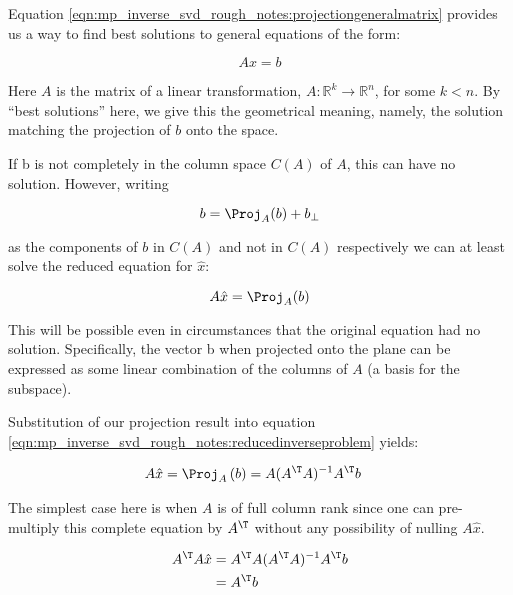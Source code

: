 


Equation \ref{eqn:mp_inverse_svd_rough_notes:projectiongeneralmatrix} provides us a way to find best solutions to general equations of the form:


\[
A x = b
\]

Here $A$ is the matrix of a linear transformation, $A : \mathbb{R}^k \rightarrow \mathbb{R}^n$, for some $k<n$.
By ``best solutions'' here, we give this the geometrical meaning, namely, the solution matching the projection of $b$ onto the space.

If b is not completely in the column space $C(A)$ of $A$, this can have no solution.  However, writing

\[
b = \Proj_A(b) + b_\perp
\]

as the components of $b$ in $C(A)$ and not in $C(A)$ respectively we can at least solve the reduced equation for $\hat{x}$:


\begin{equation}\label{eqn:mp_inverse_svd_rough_notes:reducedinverseproblem}
A \hat{x} = \Proj_A(b)
\end{equation}


This will be possible even in circumstances that the original equation had no solution.  Specifically, the vector b when projected onto the plane can be expressed as some
linear combination of the columns of $A$ (a basis for the subspace).

Substitution of our projection result into equation \ref{eqn:mp_inverse_svd_rough_notes:reducedinverseproblem} yields:

\begin{align*}
A \hat{x} 
&= \Proj_{A}\left(b\right) = A (A^\T A)^{-1} A^\T b
\end{align*}

The simplest case here is when $A$ is of full column rank since one can pre-multiply this complete equation by $A^\T$ without any possibility of nulling
$A \hat{x}$.

\begin{align*}
A^\T A \hat{x} 
&= A^\T A (A^\T A)^{-1} A^\T b \\
&= A^\T b \\
\end{align*}

